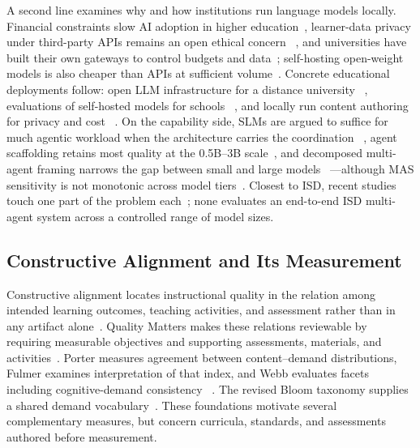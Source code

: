 A second line examines why and how institutions run language models locally.
Financial constraints slow AI adoption in higher education~\cite{robert2025educause},
learner-data privacy under third-party APIs remains an open ethical concern
~\cite{yan2024ethical}, and universities have built their own gateways to control
budgets and data~\cite{mithun2025aiverde}; self-hosting open-weight models is also
cheaper than APIs at sufficient volume~\cite{pan2025onpremise}. Concrete educational
deployments follow: open LLM infrastructure for a distance university
~\cite{zesch2024flexi}, evaluations of self-hosted models for schools
~\cite{chan2026bigger}, and locally run content authoring for privacy and cost
~\cite{reza2025smallmodels}. On the capability side, SLMs are argued to suffice for
much agentic workload when the architecture carries the coordination
~\cite{belcak2025slm,sharma2025slmagents}, agent scaffolding retains most quality
at the 0.5B--3B scale~\cite{kang2025agentdistill}, and decomposed multi-agent
framing narrows the gap between small and large models
~\cite{shen2024multillmagent}---although MAS sensitivity is not monotonic
across model tiers~\cite{cho2026harness}. Closest to ISD, recent studies touch one
part of the problem each~\cite{jaldi2026slmassessment,zheng2025lessonplanlm,
lee2026educlaw,wei2026slmeducation}; none evaluates an end-to-end ISD multi-agent
system across a controlled range of model sizes.

\subsection{Constructive Alignment and Its Measurement}

Constructive alignment locates instructional quality in the relation among intended
learning outcomes, teaching activities, and assessment rather than in any artifact
alone~\cite{biggs1996enhancing,biggs2011teaching}. Quality Matters makes these
relations reviewable by requiring measurable objectives and supporting assessments,
materials, and activities~\cite{qm2018rubric}. Porter measures agreement between
content--demand distributions, Fulmer examines interpretation of that index, and
Webb evaluates facets including cognitive-demand consistency
~\cite{porter2002measuring,fulmer2011estimating,webb1997criteria}. The revised
Bloom taxonomy supplies a shared demand vocabulary~\cite{anderson2001taxonomy}.
These foundations motivate several complementary measures, but concern curricula,
standards, and assessments authored before measurement.

